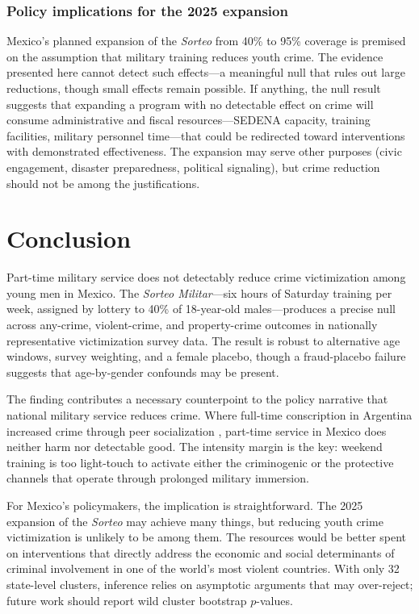 \documentclass[12pt]{article}
\begin{document}
\subsubsection*{Policy implications for the 2025 expansion} Mexico's planned expansion of the \textit{Sorteo} from 40\% to 95\% coverage is premised on the assumption that military training reduces youth crime. The evidence presented here cannot detect such effects---a meaningful null that rules out large reductions, though small effects remain possible. If anything, the null result suggests that expanding a program with no detectable effect on crime will consume administrative and fiscal resources---SEDENA capacity, training facilities, military personnel time---that could be redirected toward interventions with demonstrated effectiveness. The expansion may serve other purposes (civic engagement, disaster preparedness, political signaling), but crime reduction should not be among the justifications.


\section{Conclusion}
\label{sec:conclusion}

Part-time military service does not detectably reduce crime victimization among young men in Mexico. The \textit{Sorteo Militar}---six hours of Saturday training per week, assigned by lottery to 40\% of 18-year-old males---produces a precise null across any-crime, violent-crime, and property-crime outcomes in nationally representative victimization survey data. The result is robust to alternative age windows, survey weighting, and a female placebo, though a fraud-placebo failure suggests that age-by-gender confounds may be present.

The finding contributes a necessary counterpoint to the policy narrative that national military service reduces crime. Where full-time conscription in Argentina increased crime through peer socialization \citep{galiani2011conscription}, part-time service in Mexico does neither harm nor detectable good. The intensity margin is the key: weekend training is too light-touch to activate either the criminogenic or the protective channels that operate through prolonged military immersion.

For Mexico's policymakers, the implication is straightforward. The 2025 expansion of the \textit{Sorteo} may achieve many things, but reducing youth crime victimization is unlikely to be among them. The resources would be better spent on interventions that directly address the economic and social determinants of criminal involvement in one of the world's most violent countries. With only 32 state-level clusters, inference relies on asymptotic arguments that may over-reject; future work should report wild cluster bootstrap $p$-values.
\end{document}
